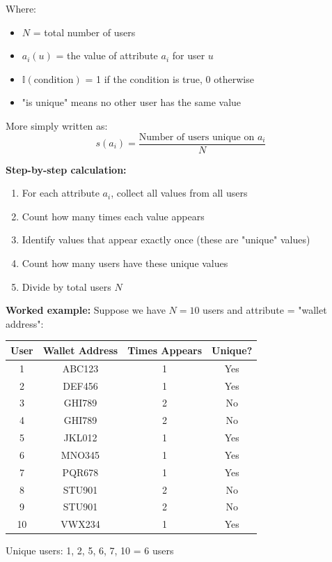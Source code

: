 \documentclass[12pt,a4paper,oneside,openany]{report}
\begin{document}
Where:
\begin{itemize}
    \item $N$ = total number of users
    \item $a_i(u)$ = the value of attribute $a_i$ for user $u$
    \item $\mathbb{I}(\text{condition})$ = 1 if the condition is true, 0 otherwise
    \item "is unique" means no other user has the same value
\end{itemize}

More simply written as:
\begin{equation}
s(a_i) = \frac{\text{Number of users unique on } a_i}{N}
\end{equation}

\textbf{Step-by-step calculation:}
\begin{enumerate}
    \item For each attribute $a_i$, collect all values from all users
    \item Count how many times each value appears
    \item Identify values that appear exactly once (these are "unique" values)
    \item Count how many users have these unique values
    \item Divide by total users $N$
\end{enumerate}

\textbf{Worked example:} Suppose we have $N = 10$ users and attribute = "wallet address":
\begin{table}[H]
\centering
\begin{tabular}{cccc}
User & Wallet Address & Times Appears & Unique? \\
\hline
1 & ABC123 & 1 & Yes \\
2 & DEF456 & 1 & Yes \\
3 & GHI789 & 2 & No \\
4 & GHI789 & 2 & No \\
5 & JKL012 & 1 & Yes \\
6 & MNO345 & 1 & Yes \\
7 & PQR678 & 1 & Yes \\
8 & STU901 & 2 & No \\
9 & STU901 & 2 & No \\
10 & VWX234 & 1 & Yes \\
\end{tabular}
\end{table}

Unique users: 1, 2, 5, 6, 7, 10 = 6 users
\end{document}
